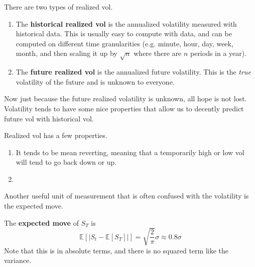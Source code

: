\documentclass{article}
\begin{document}
    \begin{definition}
      \label{def:realized-vol}
      There are two types of realized vol. 
      \begin{enumerate}
        \item The \textbf{historical realized vol} is the annualized volatility measured with historical data. This is usually easy to compute with data, and can be computed on different time granularities (e.g. minute, hour, day, week, month, and then scaling it up by $\sqrt{n}$ where there are $n$ periods in a year). 
        \item The \textbf{future realized vol} is the annualized future volatility. This is the \textit{true} volatility of the future and is unknown to everyone. 
      \end{enumerate}
    \end{definition}

    Now just because the future realized volatility is unknown, all hope is not lost. Volatility tends to have some nice properties that allow us to decently predict future vol with historical vol. 

    \begin{theorem}
      \label{thm:properties-of-realized-vol}
      Realized vol has a few properties. 
      \begin{enumerate}
        \item It tends to be mean reverting, meaning that a temporarily high or low vol will tend to go back down or up. 
        \item 
      \end{enumerate}
    \end{theorem}

    Another useful unit of measurement that is often confused with the volatility is the expected move. 

    \begin{definition}
      \label{def:expected-move}
      The \textbf{expected move} of $S_T$ is 
      \begin{equation}
        \mathbb{E}[|S_t - \mathbb{E}[S_T]|] = \sqrt{\frac{2}{\pi}} \sigma \approx 0.8 \sigma
      \end{equation}
      Note that this is in absolute terms, and there is no squared term like the variance. 
    \end{definition}
\end{document}
